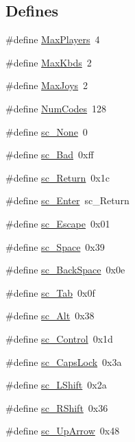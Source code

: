\subsection*{Defines}
\begin{DoxyCompactItemize}
\item 
\#define \hyperlink{ID__IN_8H_ad59b3107f72d926085f8762305e6c030}{MaxPlayers}~4
\item 
\#define \hyperlink{ID__IN_8H_a557ca9fbb043bb6f6d8cc8492321ce2f}{MaxKbds}~2
\item 
\#define \hyperlink{ID__IN_8H_a46db284a6cc158d0ccac9ef0151ed312}{MaxJoys}~2
\item 
\#define \hyperlink{ID__IN_8H_a2e55fe4ebe3e35fad09ea1c57a710129}{NumCodes}~128
\item 
\#define \hyperlink{ID__IN_8H_a786273284de615882c837b331eb1f317}{sc\_\-None}~0
\item 
\#define \hyperlink{ID__IN_8H_adee51c7c4fb0dd57ca0aec24d2756266}{sc\_\-Bad}~0xff
\item 
\#define \hyperlink{ID__IN_8H_a44015ffcf3b9ee4fc15c29edab389531}{sc\_\-Return}~0x1c
\item 
\#define \hyperlink{ID__IN_8H_a3e9ec0b8613dc9dcd7e983afa3c6b412}{sc\_\-Enter}~sc\_\-Return
\item 
\#define \hyperlink{ID__IN_8H_a69d61eb9fda6c28c8ddaf7c9cde5367d}{sc\_\-Escape}~0x01
\item 
\#define \hyperlink{ID__IN_8H_ab8b6385289dfdf8e27d8f3b39464d44f}{sc\_\-Space}~0x39
\item 
\#define \hyperlink{ID__IN_8H_ad406a304cdd237856975f5c911e71049}{sc\_\-BackSpace}~0x0e
\item 
\#define \hyperlink{ID__IN_8H_a6e5fd91b91e78919dfab2bcd3b7eede1}{sc\_\-Tab}~0x0f
\item 
\#define \hyperlink{ID__IN_8H_a166a227bde5c686bb85c1006d87b6f05}{sc\_\-Alt}~0x38
\item 
\#define \hyperlink{ID__IN_8H_a668e8e3177eeb838288f0bac32a0ea09}{sc\_\-Control}~0x1d
\item 
\#define \hyperlink{ID__IN_8H_a9f53546ac824999f93f97565c18a8da2}{sc\_\-CapsLock}~0x3a
\item 
\#define \hyperlink{ID__IN_8H_a52b1add06e41f56bfb1d5b4fc02c604c}{sc\_\-LShift}~0x2a
\item 
\#define \hyperlink{ID__IN_8H_a575cec6fde53c83e88fda93c450ac1ba}{sc\_\-RShift}~0x36
\item 
\#define \hyperlink{ID__IN_8H_a69f1f47658ef3ebb061bd66d83db9f06}{sc\_\-UpArrow}~0x48
\item 

\end{DoxyCompactItemize}
